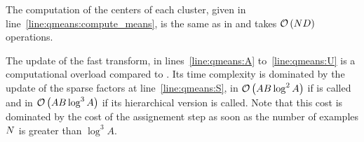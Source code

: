 The computation of the centers of each cluster, given in line~\ref{line:qmeans:compute_means}, is the same as in \kmeans and takes $\mathcal{O}\left(ND\right)$ operations.

The update of the fast transform, in lines~\ref{line:qmeans:A} to~\ref{line:qmeans:U} is a computational overload compared to \kmeans. 
Its time complexity is dominated by the update of the sparse factors at line~\ref{line:qmeans:S}, in $\mathcal{O}\left(AB \log^2 A\right)$ if \palm is called and in $\mathcal{O}\left(AB \log^3 A\right)$ if its hierarchical version is called. 
Note that this cost is dominated by the cost of the assignement step as soon as the number of examples $N$ is greater than $\log^3 A$.

